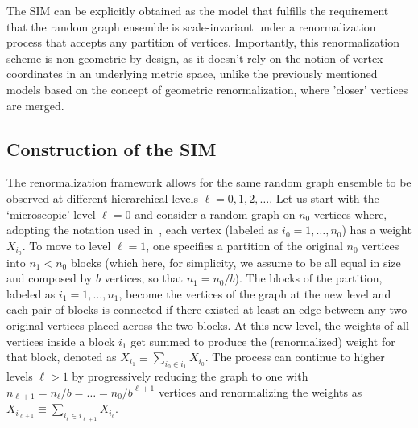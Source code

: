\documentclass[11pt, reqno]{amsart}
\numberwithin{equation}{section}
\theoremstyle{plain} %
\theoremstyle{definition} %
\begin{document}
The SIM can be explicitly obtained as the model that fulfills the requirement that the random graph ensemble is scale-invariant under a renormalization process that accepts any partition of vertices. Importantly, this renormalization scheme is non-geometric by design, as it doesn't rely on the notion of vertex coordinates in an underlying metric space, unlike the previously mentioned models based on the concept of geometric renormalization, where 'closer' vertices are merged.

\subsection{Construction of the SIM}
The renormalization framework allows for the same random graph ensemble to be observed at different hierarchical levels $\ell=0,1,2,\dots$. 
Let us start with the `microscopic' level $\ell=0$ and consider a random graph on $n_0$ vertices where, adopting the  notation used in~\cite{GMD2020}, each vertex (labeled as $i_0=1,\dots,n_0$) has a weight $X_{i_0}$. 
To move to level $\ell=1$, one specifies a partition of the original $n_0$ vertices into $n_1<n_0$ blocks (which here, for simplicity, we assume to be all equal in size and composed by $b$ vertices, so that $n_1=n_0/b$). 
The blocks of the partition, labeled as $i_1=1,\dots,n_1$, become the vertices of the graph at the new level and each pair of blocks is connected if there existed at least an edge between any two original vertices placed across the two blocks. 
At this new level, the weights of all vertices inside a block $i_1$ get summed to produce the (renormalized) weight for that  block, denoted as $X_{i_1}\equiv \sum_{i_0\in i_1} X_{i_0}$. 
The process can continue to higher levels $\ell>1$ by progressively reducing the graph to one with $n_{\ell+1}=n_{\ell}/b=\dots=n_0/b^{\ell+1}$ vertices and renormalizing the weights as $X_{i_{\ell+1}}\equiv \sum_{i_{\ell}\in i_{\ell+1}} X_{i_{\ell}}$.
\end{document}

